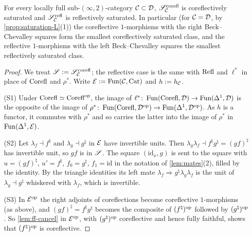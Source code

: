 \begin{thm}
\label{thm:saturation-saturated}
%
For every locally full sub-$(\infty,2)$-category $\mathcal{C} \subset \mathcal{D}$,
$\mathscr{S}^{\mathrm{corefl}}_{\mathcal{C}}$
is coreflectively saturated and
$\mathscr{S}^{\mathrm{refl}}_{\mathcal{C}}$
is reflectively saturated.
In particular (for $\mathcal{C} = \mathcal{D}$, by \cref{prop:saturation-L}(1)) the coreflective
$1$-morphisms with the right Beck--Chevalley squares form the smallest
coreflectively saturated class, and the reflective $1$-morphisms with the left
Beck--Chevalley squares the smallest reflectively saturated class.
\end{thm}

\begin{proof}
%
We treat
$\mathscr{S} := \mathscr{S}^{\mathrm{corefl}}_{\mathcal{C}}$;
the reflective case is the same with $\mathrm{Refl}$ and $\ell^{*}$ in place of
$\mathrm{Corefl}$ and $\rho^{*}$. Write $\mathcal{E} := \operatorname{Fun}(\mathcal{C},\mathrm{Cat})$ and $h := h_{\mathcal{C}}$.

(S1) Under
$\mathrm{Corefl} \simeq \mathrm{Corefl}^{\mathrm{op}}$,
the image of
$\ell^{*}\colon \operatorname{Fun}(\mathrm{Corefl},\mathcal{D}) \to \operatorname{Fun}(\Delta^{1},\mathcal{D})$
is the opposite of the image of
$\rho^{*}\colon \operatorname{Fun}(\mathrm{Corefl},\mathcal{D}^{\mathrm{op}}) \to \operatorname{Fun}(\Delta^{1},\mathcal{D}^{\mathrm{op}})$.
As $h$ is a functor, it commutes with $\rho^{*}$ and so carries the latter into
the image of $\rho^{*}$ in $\operatorname{Fun}(\Delta^{1},\mathcal{E})$.

(S2) Let
$\lambda_{f} \dashv f^{\natural}$
and
$\lambda_{g} \dashv g^{\natural}$
in $\mathcal{E}$ have invertible units. Then
$\lambda_{g}\lambda_{f} \dashv f^{\natural}g^{\natural} = (gf)^{\natural}$
has invertible unit, so $gf$ is in $\mathscr{S}$.
The square $(\mathrm{id}_{x},g)$ is sent to the square with $u =
(gf)^{\natural}$, $u' = f^{\natural}$, $f_{0} = g^{\natural}$,
$f_{1} = \mathrm{id}$ in the notation of \cref{lem:mates}(2),
filled by the identity. By the triangle identities its left mate
$\lambda_{f} \Rightarrow g^{\natural}\lambda_{g}\lambda_{f}$
is the unit of
$\lambda_{g} \dashv g^{\natural}$
whiskered with $\lambda_{f}$, which is invertible.

(S3) In $\mathcal{E}^{\mathrm{op}}$ the right adjoints of coreflections become coreflective
$1$-morphisms (as above), and
$(gf)^{\natural} = f^{\natural}g^{\natural}$
becomes the composite of $(f^{\natural})^{\mathrm{op}}$ followed by
$(g^{\natural})^{\mathrm{op}}$. So \cref{lem:ff-cancel} in $\mathcal{E}^{\mathrm{op}}$,
with $(g^{\natural})^{\mathrm{op}}$ coreflective and hence fully faithful,
shows that $(f^{\natural})^{\mathrm{op}}$ is coreflective.


\end{proof}
